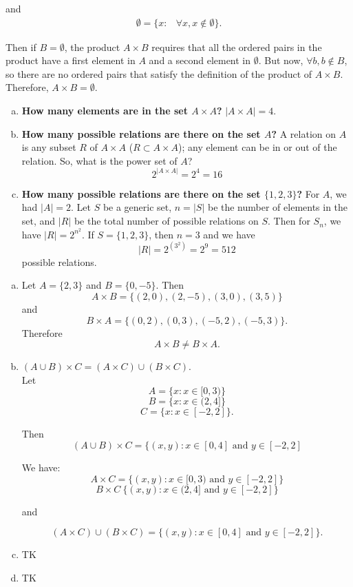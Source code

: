 \documentclass[12pt]{scrartcl} %
\begin{document}
and
	\begin{align*}
	\emptyset = \{x: &\forall x, x\notin \emptyset\}.
	\end{align*}
	
	
	Then if $B = \emptyset$, the product $A\times B$ requires that all the ordered pairs in the product have a first element in $A$ and a second element in $\emptyset$. But now, $\forall b, b \notin B$, so there are no ordered pairs that satisfy the definition of the product of $A \times B$.  \\
	Therefore, $A \times B= \emptyset$.
	
	
\begin{enumerate}[(a)]
\item \textbf{How many elements are in the set $A \times A$?}
$\mathopen|A \times A \mathclose| = 4$.
\item \textbf{How many possible relations are there on the set $A$?}
A relation on $A$ is any subset $R$ of $A \times A$ ($R \subset A \times A$); any element can be in or out of the relation. So, what is the power set of $A$?
$$ 2^{\mathopen|A \times A \mathclose|} = 2^4 = 16 $$
\item \textbf{How many possible relations are there on the set $\{1, 2, 3\}$?}
For $A$, we had $\mathopen|A \mathclose| = 2$. Let $S$ be a generic set, $n = \mathopen| S \mathclose|$ be the number of elements in the set, and $\mathopen| R \mathclose|$ be the total number of possible relations on $S$. Then for $S_n$, we have $\mathopen| R \mathclose| = 2^{n^2}$. If $S = \{1, 2, 3\}$, then $n = 3$ and we have
$$ \mathopen| R \mathclose| = 2^{(3^2)} = 2^9 = 512 $$ possible relations.
\end{enumerate}

\begin{enumerate}[(a)]
\item Let $A = \{2, 3\}$ and $B = \{0, -5\}$.
Then $$ A \times B = \{(2,0), (2,-5), (3,0), (3,5)\} $$ and 
$$ B \times A = \{(0,2), (0,3), (-5,2), (-5,3)\}. $$ Therefore $$ A \times B \neq B \times A. $$
\item $(A \cup B) \times C = (A \times C) \cup (B \times C)$. \\
Let $$ A = \{x: x \in [0, 3)\} $$
$$ B = \{x: x \in (2, 4]\} $$
$$ C = \{x: x \in [-2, 2]\}. $$

Then $$ (A \cup B) \times C = \{(x,y): x \in [0, 4] \text{ and } y \in [-2, 2] $$

We have:
$$ A \times C = \{(x, y): x \in [0,3) \text{ and } y \in [-2,2]\} $$
$$ B \times C \ \{(x, y): x \in (2, 4] \text{ and } y \in [-2, 2]\} $$

and 

$$ (A \times C) \cup (B \times C) = \{(x, y): x \in [0, 4] \text{ and } y \in [-2, 2] \}.$$
\item TK
\item TK
\end{enumerate}
	
\end{document}
